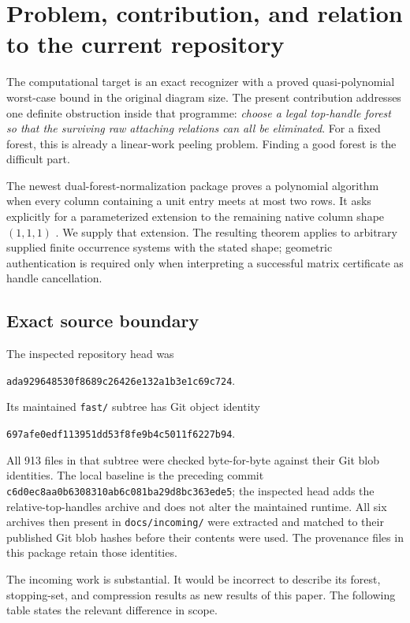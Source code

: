 \section{Problem, contribution, and relation to the current repository}
\label{sec:position}

The computational target is an exact recognizer with a proved
quasi-polynomial worst-case bound in the original diagram size. The present
contribution addresses one definite obstruction inside that programme:
\emph{choose a legal top-handle forest so that the surviving raw attaching
relations can all be eliminated}. For a fixed forest, this is already a
linear-work peeling problem. Finding a good forest is the difficult part.

The newest dual-forest-normalization package proves a polynomial algorithm
when every column containing a unit entry meets at most two rows. It asks
explicitly for a parameterized extension to the remaining native column
shape $(1,1,1)$ \cite{repo-dual-normalization}. We supply that extension.
The resulting theorem applies to arbitrary supplied finite occurrence
systems with the stated shape; geometric authentication is required only
when interpreting a successful matrix certificate as handle cancellation.

\subsection{Exact source boundary}

The inspected repository head was
\begin{center}
\small\texttt{ada929648530f8689c26426e132a1b3e1c69c724}.
\end{center}
Its maintained \texttt{fast/} subtree has Git object identity
\begin{center}
\small\texttt{697afe0edf113951dd53f8fe9b4c5011f6227b94}.
\end{center}
All 913 files in that subtree were checked byte-for-byte against their
Git blob identities. The local baseline is the preceding commit
\texttt{c6d0ec8aa0b6308310ab6c081ba29d8bc363ede5}; the inspected head adds
the relative-top-handles archive and does not alter the maintained runtime.
All six archives then present in \texttt{docs/incoming/} were extracted and
matched to their published Git blob hashes before their contents were used.
The provenance files in this package retain those identities.

The incoming work is substantial. It would be incorrect to describe its
forest, stopping-set, and compression results as new results of this paper.
The following table states the relevant difference in scope.

